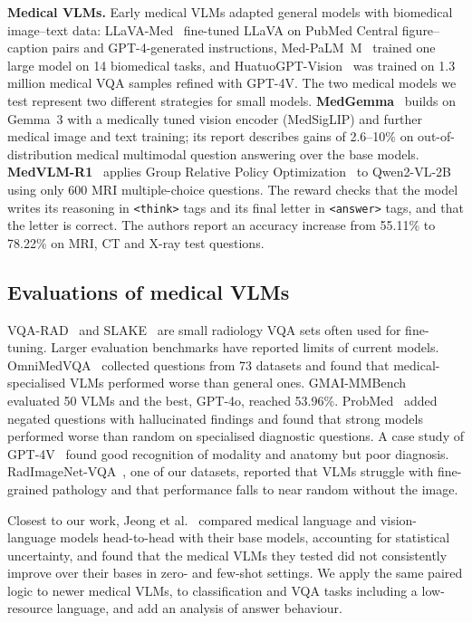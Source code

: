 \documentclass[doublecolumn]{ijcvsplatex}
\newcommand{\qwen}{Qwen2-VL}
\newcommand{\medvlm}{MedVLM-R1}
\newcommand{\gemma}{Gemma~3}
\newcommand{\medgemma}{MedGemma}
\begin{document}
\textbf{Medical VLMs.} Early medical VLMs adapted general models with biomedical image--text data: LLaVA-Med~\cite{li2023llavamed} fine-tuned LLaVA on PubMed Central figure--caption pairs and GPT-4-generated instructions, Med-PaLM~M~\cite{tu2023medpalmm} trained one large model on 14 biomedical tasks, and HuatuoGPT-Vision~\cite{chen2024huatuogptvision} was trained on 1.3 million medical VQA samples refined with GPT-4V. The two medical models we test represent two different strategies for small models. \textbf{\medgemma{}}~\cite{sellergren2025medgemma} builds on \gemma{} with a medically tuned vision encoder (MedSigLIP) and further medical image and text training; its report describes gains of 2.6--10\% on out-of-distribution medical multimodal question answering over the base models. \textbf{\medvlm{}}~\cite{pan2025medvlmr1} applies Group Relative Policy Optimization~\cite{shao2024deepseekmath} to \qwen{}-2B using only 600 MRI multiple-choice questions. The reward checks that the model writes its reasoning in \texttt{<think>} tags and its final letter in \texttt{<answer>} tags, and that the letter is correct. The authors report an accuracy increase from 55.11\% to 78.22\% on MRI, CT and X-ray test questions.

\subsection{Evaluations of medical VLMs}
VQA-RAD~\cite{lau2018vqarad} and SLAKE~\cite{liu2021slake} are small radiology VQA sets often used for fine-tuning. Larger evaluation benchmarks have reported limits of current models. OmniMedVQA~\cite{hu2024omnimedvqa} collected questions from 73 datasets and found that medical-specialised VLMs performed worse than general ones. GMAI-MMBench~\cite{chen2024gmaimmbench} evaluated 50 VLMs and the best, GPT-4o, reached 53.96\%. ProbMed~\cite{yan2024probmed} added negated questions with hallucinated findings and found that strong models performed worse than random on specialised diagnostic questions. A case study of GPT-4V~\cite{wu2023gpt4vmed} found good recognition of modality and anatomy but poor diagnosis. RadImageNet-VQA~\cite{butsanets2025radimagenetvqa}, one of our datasets, reported that VLMs struggle with fine-grained pathology and that performance falls to near random without the image.

Closest to our work, Jeong et al.~\cite{jeong2024medadapt} compared medical language and vision-language models head-to-head with their base models, accounting for statistical uncertainty, and found that the medical VLMs they tested did not consistently improve over their bases in zero- and few-shot settings. We apply the same paired logic to newer medical VLMs, to classification and VQA tasks including a low-resource language, and add an analysis of answer behaviour.
\end{document}
